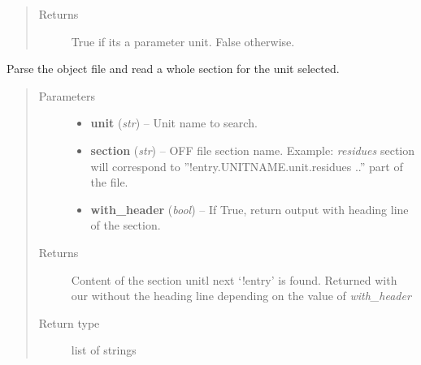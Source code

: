 \documentclass[letterpaper,10pt,english]{sphinxmanual}
\begin{document}
\begin{fulllineitems}
\begin{fulllineitems}
\begin{quote}
\begin{description}
\item[{Returns}] \leavevmode
True if its a parameter unit. False otherwise.

\end{description}\end{quote}

\end{fulllineitems}


\begin{fulllineitems}
\label{OFFManager:pyMDMix.OFFManager.OFFManager.readOffSection}
Parse the object file and read a whole section for the unit selected.
\begin{quote}\begin{description}
\item[{Parameters}] \leavevmode\begin{itemize}
\item {} 
\textbf{unit} (\emph{str}) -- Unit name to search.

\item {} 
\textbf{section} (\emph{str}) -- OFF file section name. Example: \emph{residues} section will correspond to ''!entry.UNITNAME.unit.residues ..''  part of the file.

\item {} 
\textbf{with\_header} (\emph{bool}) -- If True, return output with heading line of the section.

\end{itemize}

\item[{Returns}] \leavevmode
Content of the section unitl next `!entry' is found. Returned with our without the heading line depending
on the value of \emph{with\_header}

\item[{Return type}] \leavevmode
list of strings

\end{description}\end{quote}

\end{fulllineitems}


\end{fulllineitems}

\end{document}
